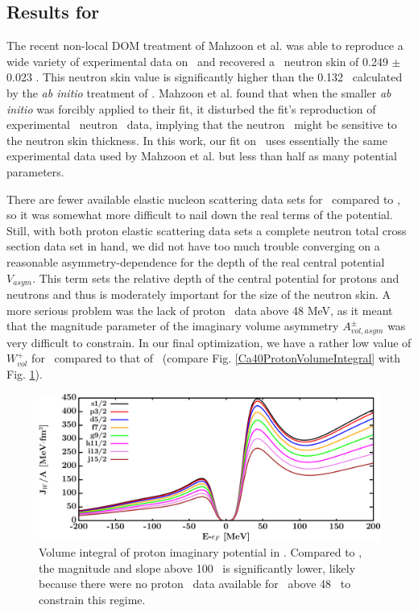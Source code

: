\subsection{Results for \caEight}
The recent non-local DOM treatment of Mahzoon et al. \cite{Mahzoon2017} was able
to reproduce a wide variety of
experimental data on \caEight\ and recovered a \caEight\ neutron
skin of 0.249 $\pm$ 0.023 \femto\meter.
This neutron skin value is significantly higher than the 0.132 \femto\meter\ calculated by
the \textit{ab initio} treatment of \cite{Hagen2016}. Mahzoon et al. found that when the 
smaller \textit{ab initio} was forcibly applied to their fit, it disturbed the fit's
reproduction of experimental \caEight\ neutron \tot\ data, implying that the neutron \tot\ might
be sensitive to the neutron skin thickness. In this work, our fit on \caEight\ uses essentially the 
same experimental data used by Mahzoon et al. but less than half as many potential parameters.

There are fewer available elastic nucleon scattering data sets for \caEight\ compared to \caForty,
so it was somewhat more difficult to nail down the real terms of the potential. Still, with both
proton elastic scattering data sets a complete neutron total cross section data set in hand, we did
not have too much trouble converging on a reasonable asymmetry-dependence for the depth of the real
central potential $V_{asym}$. This term sets the relative depth of the central potential for protons 
and neutrons and thus is moderately important for the size of the neutron skin. A more serious
problem was the lack of proton \rxn\ data above 48 MeV, as it meant that the magnitude parameter
of the imaginary volume asymmetry $A_{vol, asym}^{\pm}$ was very difficult to constrain. In our
final optimization, we have a rather low value of $W_{vol}^{+}$ for \caEight\ compared to that of
\caForty\ (compare Fig. \ref{Ca40ProtonVolumeIntegral} with Fig.
\ref{Ca48ProtonVolumeIntegral}).

\begin{figure}[tb]
    \centering
    \includegraphics[width=\textwidth]{figures/ca48_protonVolumeIntegrals.png}
    \caption[Volume integral of proton imaginary potential in \caEight]
    {
        Volume integral of proton imaginary potential in \caEight.
        Compared to \caForty, the magnitude and slope
        above 100 \mega\electronvolt\ is significantly lower, likely
        because there were no proton \rxn\ data
        available for \caEight\ above 48 \mega\electronvolt\ to constrain this
        regime.
    }
    \label{Ca48ProtonVolumeIntegral}
\end{figure}


